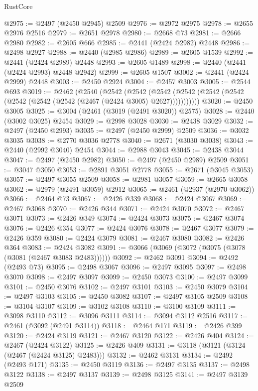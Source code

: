 \begin{lexlean}{RustCore}
\begin{coremodule}
@2975 := @2497 (@2450 @2945) @2509
@2976 := @2972 @2975
@2978 := @2655 @2976 @2516
@2979 := @2651 @2978
@2980 := @2668 @73
@2981 := @2666 @2980
@2982 := @2605 @666
@2985 := @2441 (@2424 @2982) @2448
@2986 := @2498 @2927
@2988 := @2440 (@2985 @2986)
@2989 := @2605 @1539
@2992 := @2441 (@2424 @2989) @2448
@2993 := @2605 @1489
@2998 := @2440 (@2441 (@2424 @2993) @2448 @2942)
@2999 := @2605 @1507
@3002 := @2441 (@2424 @2999) @2448
@3003 := @2450 @2924
@3004 := @2457 @3003
@3005 := @2544 @693
@3019 := @2462
    (@2540
      (@2542
        (@2542
          (@2542 (@2542 (@2542 (@2542 (@2542 (@2542 (@2542 (@2467 (@2424 @3005) @2627)))))))))))
@3020 := @2450 @3005
@3025 := @3004 (@2461 (@3019 (@2491 @3020)) @2575)
@3028 := @2440 (@3002 @3025) @2454
@3029 := @2998 @3028
@3030 := @2438 @3029
@3032 := @2497 (@2450 @2993)
@3035 := @2497 (@2450 @2999) @2509
@3036 := @3032 @3035
@3038 := @2770 @3036 @2778
@3040 := @2671 (@3030 @3038)
@3043 := @2440 (@2992 @3040) @2454
@3044 := @2988 @3043
@3045 := @2438 @3044
@3047 := @2497 (@2450 @2982)
@3050 := @2497 (@2450 @2989) @2509
@3051 := @3047 @3050
@3053 := @2891 @3051 @2778
@3055 := @2671 (@3045 @3053)
@3057 := @2497 @3055 @2509
@3058 := @2981 @3057
@3059 := @2665 @3058
@3062 := @2979 (@2491 @3059) @2912
@3065 := @2461 (@2937 (@2970 @3062))
@3066 := @2464 @73
@3067 := @2426 @339
@3068 := @2424 @3067
@3069 := @2467 @3068
@3070 := @2426 @344
@3071 := @2424 @3070
@3072 := @2467 @3071
@3073 := @2426 @349
@3074 := @2424 @3073
@3075 := @2467 @3074
@3076 := @2426 @354
@3077 := @2424 @3076
@3078 := @2467 @3077
@3079 := @2426 @359
@3080 := @2424 @3079
@3081 := @2467 @3080
@3082 := @2426 @364
@3083 := @2424 @3082
@3091 := @3066 (@3069 (@3072 (@3075 (@3078 (@3081 (@2467 @3083 @2483))))))
@3092 := @2462 @3091
@3094 := @2492 (@2493 @73)
@3095 := @2498 @3067
@3096 := @2497 @3095
@3097 := @2498 @3070
@3098 := @2497 @3097
@3099 := @2450 @3073
@3100 := @2497 @3099
@3101 := @2450 @3076
@3102 := @2497 @3101
@3103 := @2450 @3079
@3104 := @2497 @3103
@3105 := @2450 @3082
@3107 := @2497 @3105 @2509
@3108 := @3104 @3107
@3109 := @3102 @3108
@3110 := @3100 @3109
@3111 := @3098 @3110
@3112 := @3096 @3111
@3114 := @3094 @3112 @2516
@3117 := @2461 (@3092 (@2491 @3114))
@3118 := @2464 @171
@3119 := @2426 @399
@3120 := @2424 @3119
@3121 := @2467 @3120
@3122 := @2426 @404
@3124 := @2467 (@2424 @3122)
@3125 := @2426 @409
@3131 := @3118 (@3121 (@3124 (@2467 (@2424 @3125) @2483)))
@3132 := @2462 @3131
@3134 := @2492 (@2493 @171)
@3135 := @2450 @3119
@3136 := @2497 @3135
@3137 := @2498 @3122
@3138 := @2497 @3137
@3139 := @2498 @3125
@3141 := @2497 @3139 @2509

\end{coremodule}
\end{lexlean}
